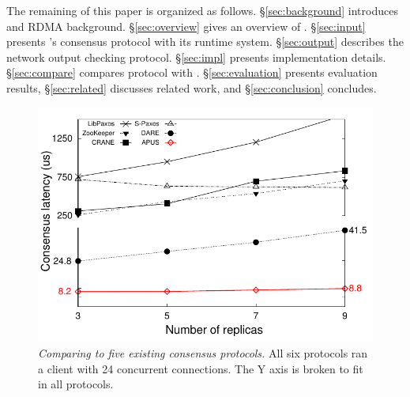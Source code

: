 The remaining of this paper is organized as follows.
\S\ref{sec:background} introduces \paxos and RDMA background.
\S\ref{sec:overview} gives an overview of \xxx. \S\ref{sec:input} presents 
\xxx's consensus protocol with its runtime system. \S\ref{sec:output} describes 
the network output checking protocol. \S\ref{sec:impl} presents implementation 
details. \S\ref{sec:compare} compares \xxx protocol with \dare. 
\S\ref{sec:evaluation} presents evaluation results, 
\S\ref{sec:related} discusses related work, and \S\ref{sec:conclusion} 
concludes. 

\begin{figure}[t]
\centering
\vspace{-.10in}
\includegraphics[width=.48\textwidth]{figures/traditional_paxos_latency}
\vspace{-.1in}
\caption{{\em Comparing \xxx to five existing consensus protocols.} All 
six protocols ran a client with 24 concurrent connections. The Y axis is 
broken to fit in all protocols.}
\label{fig:scalability}
\vspace{-.3in}
\end{figure}
